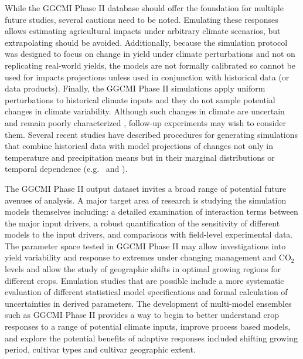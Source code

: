 \documentclass[gmd, manuscript]{copernicus} %
\begin{document}
While the GGCMI Phase II database should offer the foundation for multiple future studies, several cautions need to be noted. Emulating these responses allows estimating agricultural impacts under arbitrary climate scenarios, but extrapolating should be avoided. Additionally, because the simulation protocol was designed to focus on change in yield under climate perturbations and not on replicating real-world yields, the models are not formally calibrated so cannot be used for impacts projections unless used in conjunction with historical data (or data products). Finally, the GGCMI Phase II simulations apply uniform perturbations to historical climate inputs and they do not sample potential changes in climate variability. Although such changes in climate are uncertain and remain poorly characterized \citep[e.g.][]{Alexande2006, Kodra2014}, follow-up experiments may wish to consider them. Several recent studies have described procedures for generating simulations that combine historical data with model projections of changes not only in temperature and precipitation means but in their marginal distributions or temporal dependence (e.g.\ \citet{Leeds2015, poppick2016, Won16} and \citet{Haugen2018}).

The GGCMI Phase II output dataset invites a broad range of potential future avenues of analysis. A major target area of research is studying the simulation models themselves including: a detailed examination of interaction terms between the major input drivers, a robust quantification of the sensitivity of different models to the input drivers, and comparisons with field-level experimental data. The parameter space tested in GGCMI Phase II may allow investigations into yield variability and response to extremes under changing management and CO$_2$ levels and allow the study of geographic shifts in optimal growing regions for different crops. Emulation studies that are possible include a more systematic evaluation of different statistical model specifications and formal calculation of uncertainties in derived parameters. The development of multi-model ensembles such as GGCMI Phase II provides a way to begin to better understand crop responses to a range of potential climate inputs, improve process based models, and explore the potential benefits of adaptive responses included shifting growing period, cultivar types and cultivar geographic extent.

\end{document}
